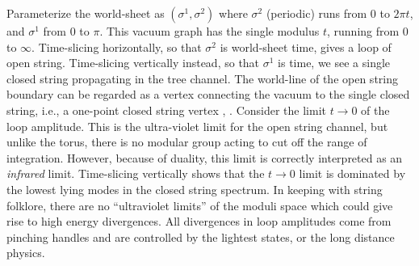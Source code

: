 \documentclass[12pt]{article}
\begin{document}
Parameterize the world-sheet as $(\sigma^1,\sigma^2)$ where
$\sigma^2$ (periodic) runs from $0$ to $2\pi t$, and $\sigma^1$ from $0$ to
$\pi$. This vacuum graph has the single modulus $t$, running from $0$ to
$\infty$.  Time-slicing horizontally, so that $\sigma^2$
is world-sheet time, gives a loop of open string.  Time-slicing
vertically instead, so that $\sigma^1$ is time, we see a single
closed string propagating in the tree channel.  The world-line of the open
string boundary can be regarded as a vertex connecting the vacuum to the
single closed string, i.e., a one-point closed string
vertex \cite{chans}, \cite{rrex}. Consider the limit $t \to 0$ of the loop amplitude. This is the 
ultra-violet limit for the open string channel, but unlike the torus, there
is no modular group acting to cut off the range of integration.  However,
because of duality, this limit is correctly interpreted as an {\it
infrared} limit.  Time-slicing vertically shows that the
$t \to 0$ limit is dominated by the lowest lying modes in the
closed string spectrum.  In keeping with string folklore, there are no
``ultraviolet limits'' of the moduli space  which could give rise to high
energy divergences.  All divergences in loop amplitudes come from pinching
handles and are controlled by the lightest states, or the long distance
physics.
\end{document}
